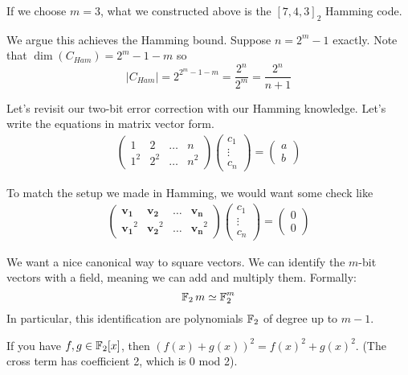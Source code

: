 If we choose $m = 3$, what we constructed above is the $[7, 4, 3]_2$ Hamming code.

We argue this achieves the Hamming bound. Suppose $n = 2^m - 1$ exactly. Note that $\dim(C_{Ham}) = 2^m - 1 - m$ so 
\[ |C_{Ham}| = 2^{2^m - 1 - m} = \frac{2^n}{2^m} = \frac{2^n}{n + 1} \]

Let's revisit our two-bit error correction with our Hamming knowledge. Let's write the equations in matrix vector form.
\begin{align*}
    \begin{pmatrix}
        1 & 2 & \dots & n \\
        1^2 & 2^2 & \dots & n^2
    \end{pmatrix} \begin{pmatrix}
        c_1 \\ \vdots \\ c_n
    \end{pmatrix} = \begin{pmatrix}
        a \\ b
    \end{pmatrix}
\end{align*}

To match the setup we made in Hamming, we would want some check like
\begin{align*}
    \begin{pmatrix}
        \mathbf{v_1} & \mathbf{v_2} & \dots & \mathbf{v_n} \\
        \mathbf{v_1}^2 & \mathbf{v_2}^2 & \dots & \mathbf{v_n}^2
    \end{pmatrix} \begin{pmatrix}
        c_1 \\ \vdots \\ c_n
    \end{pmatrix} = \begin{pmatrix}
        0 \\ 0
    \end{pmatrix}
\end{align*}

We want a nice canonical way to square vectors. We can identify the $m$-bit vectors with a field, meaning we can add and multiply them.
Formally:
\[ \operatorname{\mathbb{F}}_2 m \simeq \operatorname{\mathbb{F}}_2^m \]
In particular, this identification are polynomials $\operatorname{\mathbb{F}}_2$ of degree up to $m - 1$.

\begin{note}
    If you have $f, g \in \operatorname{\mathbb{F}}_2[x]$, then $(f(x) + g(x))^2 = f(x)^2 + g(x)^2$. (The cross term has coefficient 2, which is 0 mod 2).
\end{note}

